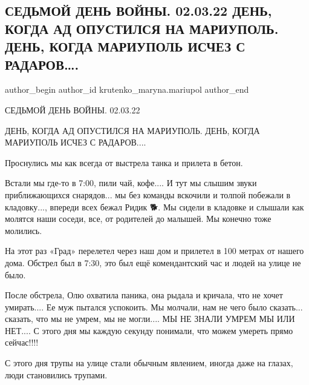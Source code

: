  
 
 
 
 

\subsection{СЕДЬМОЙ ДЕНЬ ВОЙНЫ. 02.03.22 ДЕНЬ, КОГДА АД ОПУСТИЛСЯ НА МАРИУПОЛЬ. ДЕНЬ, КОГДА МАРИУПОЛЬ ИСЧЕЗ С РАДАРОВ….}
\label{sec:02_03_2023.fb.krutenko_maryna.mariupol.1.sedmoi_den_voini__02}

\ifcmt
 author_begin
   author_id krutenko_maryna.mariupol
 author_end
\fi

СЕДЬМОЙ ДЕНЬ ВОЙНЫ. 02.03.22

ДЕНЬ, КОГДА АД ОПУСТИЛСЯ НА МАРИУПОЛЬ. ДЕНЬ, КОГДА МАРИУПОЛЬ ИСЧЕЗ С РАДАРОВ....

Проснулись мы как всегда от выстрела танка и прилета в бетон. 

Встали мы где-то в 7:00, пили чай, кофе.... И тут мы слышим звуки приближающихся
снарядов... мы без команды вскочили и толпой побежали в кладовку..., впереди всех
бежал Ридик 🐕. Мы сидели в кладовке и слышали как молятся наши соседи, все, от
родителей до малышей. Мы конечно тоже молились. 

На этот раз «Град» перелетел через наш дом и прилетел в 100 метрах от нашего
дома. Обстрел был в 7:30, это был ещё комендантский час и людей на улице не
было. 

После обстрела, Олю охватила паника, она рыдала и кричала, что не хочет
умирать.... Ее муж пытался успокоить. Мы молчали, нам не чего было сказать...
сказать, что мы не умрем, мы не могли.... МЫ НЕ ЗНАЛИ УМРЕМ МЫ ИЛИ НЕТ.... С этого
дня мы каждую секунду понимали, что можем умереть прямо сейчас!!!! 

С этого дня трупы на улице стали обычным явлением, иногда даже на глазах, люди
становились трупами. 

